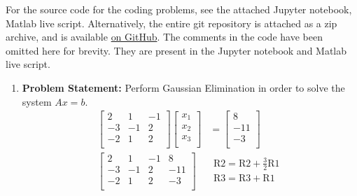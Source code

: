 \documentclass[12pt,twoside]{amsart}
\begin{document}
\thispagestyle{fancy}
\pagestyle{fancy}
\fancyhf{}

For the source code for the coding problems, see the attached Jupyter notebook, Matlab live script. Alternatively, the entire git repository  is attached as a zip archive, and is available \href{https://github.com/blackHat-Magic/math-131-HW6}{on GitHub}. The comments in the code have been omitted here for brevity. They are present in the Jupyter notebook and Matlab live script.

\begin{enumerate}
    \item \textbf{Problem Statement:} Perform Gaussian Elimination in order to solve the system $Ax = b$.
    \begin{align*}
        \left[\begin{array}{ccc}
            2 & 1 & -1 \\
            -3 & -1 & 2 \\
            -2 & 1 & 2 \\
        \end{array}\right]\left[\begin{array}{c}
            x_1 \\
            x_2 \\
            x_3 \\
        \end{array}\right] & = \left[\begin{array}{c}
            8 \\
            -11 \\
            -3 \\
        \end{array}\right] \\
        \left[\begin{array}{ccc|c}
            2 & 1 & -1 & 8 \\
            -3 & -1 & 2 & -11 \\
            -2 & 1 & 2 & -3 \\
        \end{array}\right] & \begin{array}{c}
            \text{R2} = \text{R2} + \frac{3}{2}\text{R1} \\
            \text{R3} = \text{R3} + \text{R1} \\
        \end{array} \\

\end{align*}
\end{enumerate}
\end{document}
